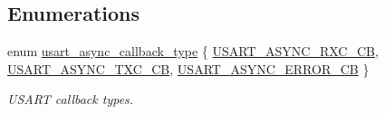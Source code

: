 \subsection*{Enumerations}
\begin{DoxyCompactItemize}
\item 
enum \hyperlink{group__doc__driver__hal__usart__async_ga5a82ef383f62daa061a55838c8fc6d39}{usart\+\_\+async\+\_\+callback\+\_\+type} \{ \hyperlink{group__doc__driver__hal__usart__async_gga5a82ef383f62daa061a55838c8fc6d39a53f74860827af0c754db79111ea4a8af}{U\+S\+A\+R\+T\+\_\+\+A\+S\+Y\+N\+C\+\_\+\+R\+X\+C\+\_\+\+CB}, 
\hyperlink{group__doc__driver__hal__usart__async_gga5a82ef383f62daa061a55838c8fc6d39a72dc4487f710fa4b902fbd97a0dbe391}{U\+S\+A\+R\+T\+\_\+\+A\+S\+Y\+N\+C\+\_\+\+T\+X\+C\+\_\+\+CB}, 
\hyperlink{group__doc__driver__hal__usart__async_gga5a82ef383f62daa061a55838c8fc6d39a5dff48ffecc0bfaf55c0fbc9f27ca8d2}{U\+S\+A\+R\+T\+\_\+\+A\+S\+Y\+N\+C\+\_\+\+E\+R\+R\+O\+R\+\_\+\+CB}
 \}\begin{DoxyCompactList}\small\item\em U\+S\+A\+RT callback types. \end{DoxyCompactList}
\end{DoxyCompactItemize}
